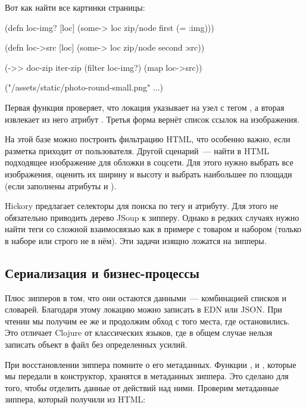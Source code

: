 Вот как найти все картинки страницы:

\begin{english}
  \begin{clojure}
(defn loc-img? [loc]
  (some-> loc zip/node first (= :img)))

(defn loc->src [loc]
  (some-> loc zip/node second :src))

(->> doc-zip
     iter-zip
     (filter loc-img?)
     (map loc->src))

("/assets/static/photo-round-small.png" ...)
  \end{clojure}
\end{english}

Первая функция проверяет, что локация указывает на узел с тегом , а
вторая извлекает из него атрибут . Третья форма вернёт список ссылок
на изображения.

На этой базе можно построить фильтрацию HTML, что особенно важно, если разметка
приходит от пользователя. Другой сценарий~--- найти в HTML подходящее изображение
для обложки в соцсети. Для этого нужно выбрать все изображения, оценить их
ширину и высоту и выбрать наибольшее по площади (если заполнены атрибуты 
и ).

Hickory предлагает селекторы для поиска по тегу и атрибуту. Для этого не
обязательно приводить дерево JSoup к зипперу. Однако в редких случаях нужно
найти теги со сложной взаимосвязью как в примере с товаром и набором (только в
наборе или строго не в нём). Эти задачи изящно ложатся на зипперы.

\subsection{Сериализация и бизнес-процессы}


Плюс зипперов в том, что они остаются данными~--- комбинацией списков и
словарей. Благодаря этому локацию можно записать в EDN или JSON. При чтении мы
получим ее же и продолжим обход с того места, где остановились. Это отличает
Clojure от классических языков, где в общем случае нельзя записать объект в файл
без определенных усилий.

При восстановлении зиппера помните о его метаданных. Функции ,
 и , которые мы передали в конструктор, хранятся в
метаданных зиппера. Это сделано для того, чтобы отделить данные от действий над
ними. Проверим метаданные зиппера, который получили из HTML:

